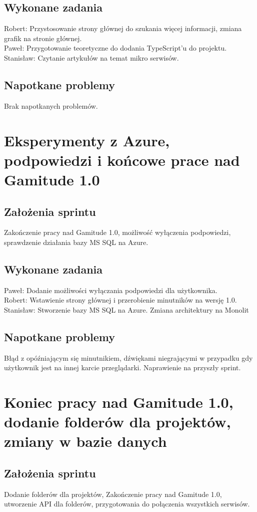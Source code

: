 \documentclass[a4paper,11pt]{report}
\begin{document}
\subsection {Wykonane zadania}
Robert: Przystosowanie strony głównej do szukania więcej informacji, zmiana grafik na stronie głównej.\\ 
Paweł: Przygotowanie teoretyczne do dodania TypeScript'u do projektu. \\
Stanisław: Czytanie artykułów na temat mikro serwisów.\\
\subsection {Napotkane problemy}
Brak napotkanych problemów.

\section {Eksperymenty z Azure, podpowiedzi i końcowe prace nad Gamitude 1.0}
\subsection {Założenia sprintu}
Zakończenie pracy nad Gamitude 1.0, możliwość wyłączenia podpowiedzi, sprawdzenie działania bazy MS SQL na Azure.
\subsection {Wykonane zadania}
Paweł: Dodanie możliwości wyłączania podpowiedzi dla użytkownika.\\ 
Robert: Wstawienie strony głównej i przerobienie minutników na wersję 1.0. \\
Stanisław: Stworzenie bazy MS SQL na Azure. Zmiana architektury na Monolit \\
\subsection {Napotkane problemy}
Błąd z opóźniającym się minutnikiem, dźwiękami niegrającymi w przypadku gdy użytkownik jest na innej karcie przeglądarki. Naprawienie na przyszły sprint.

\section {Koniec pracy nad Gamitude 1.0, dodanie folderów dla projektów, zmiany w bazie danych}
\subsection {Założenia sprintu}
Dodanie folderów dla projektów, Zakończenie pracy nad Gamitude 1.0, utworzenie API dla folderów, przygotowania do połączenia wszystkich serwisów.
\end{document}
